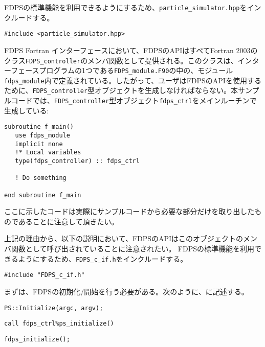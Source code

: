 \ifCpp%
FDPSの標準機能を利用できるようにするため、\texttt{particle\_simulator.hpp}をインクルードする。
\begin{lstlisting}[caption=ヘッダーファイル\texttt{particle\_simulator.hpp}のインクルード]
#include <particle_simulator.hpp>
\end{lstlisting}
\endifCpp
\ifFtn%
FDPS Fortran インターフェースにおいて、FDPSのAPIはすべてFortran 2003のクラス\texttt{FDPS\_controller}のメンバ関数として提供される。このクラスは、インターフェースプログラムの1つである\texttt{FDPS\_module.F90}の中の、モジュール\texttt{fdps\_module}内で定義されている。したがって、ユーザはFDPSのAPIを使用するために、\texttt{FDPS\_controller}型オブジェクトを生成しなければならない。本サンプルコードでは、\texttt{FDPS\_controller}型オブジェクト\texttt{fdps\_ctrl}をメインルーチンで生成している:
\begin{lstlisting}[caption=\texttt{fdps\_controller}型オブジェクトの生成]
subroutine f_main()
   use fdps_module
   implicit none
   !* Local variables
   type(fdps_controller) :: fdps_ctrl
    
   ! Do something
   
end subroutine f_main    
\end{lstlisting}
ここに示したコードは実際にサンプルコードから必要な部分だけを取り出したものであることに注意して頂きたい。

上記の理由から、以下の説明において、FDPSのAPIはこのオブジェクトのメンバ関数として呼び出されていることに注意されたい。
\endifFtn
\ifC %
FDPSの標準機能を利用できるようにするため、\texttt{FDPS\_c\_if.h}をインクルードする。
\begin{lstlisting}[caption=ヘッダーファイル\texttt{FDPS\_c\_if.h}のインクルード]
#include "FDPS_c_if.h"
\end{lstlisting}
\endifC

まずは、FDPSの初期化/開始を行う必要がある。次のように、\mainFunc に記述する。
\ifCpp%
\begin{lstlisting}[caption=FDPSの開始]
PS::Initialize(argc, argv);
\end{lstlisting}
\endifCpp
\ifFtn%
\begin{lstlisting}[caption=FDPSの開始]
call fdps_ctrl%ps_initialize()
\end{lstlisting}
\endifFtn
\ifC%
\begin{lstlisting}[caption=FDPSの開始]
fdps_initialize();
\end{lstlisting}
\endifC


